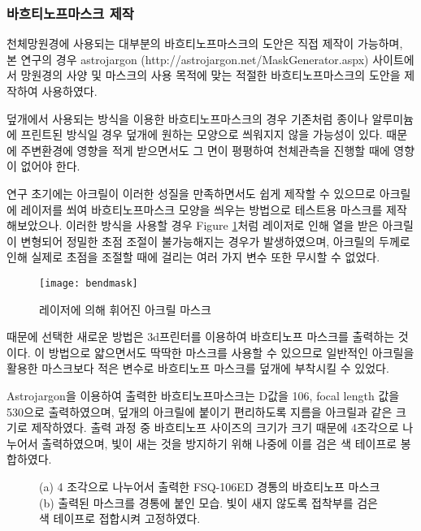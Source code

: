 \subsubsection{바흐티노프마스크 제작}
천체망원경에 사용되는 대부분의 바흐티노프마스크의 도안은 직접 제작이 가능하며, 본 연구의 경우 astrojargon (http://astrojargon.net/MaskGenerator.aspx) 사이트에서 망원경의 사양 및 마스크의 사용 목적에 맞는 적절한 바흐티노프마스크의 도안을 제작하여 사용하였다.

덮개에서 사용되는 방식을 이용한 바흐티노프마스크의 경우 기존처럼 종이나 알루미늄에 프린트된 방식일 경우 덮개에 원하는 모양으로 씌워지지 않을 가능성이 있다. 때문에 주변환경에 영향을 적게 받으면서도 그 면이 평평하여 천체관측을 진행할 때에 영향이 없어야 한다. 

연구 초기에는 아크릴이 이러한 성질을 만족하면서도 쉽게 제작할 수 있으므로 아크릴에 레이저를 쐬여 바흐티노프마스크 모양을 씌우는 방법으로 테스트용 마스크를 제작해보았으나. 이러한 방식을 사용할 경우 \textrm{Figure} \ref{bendmask}처럼 레이저로 인해 열을 받은 아크릴이 변형되어 정밀한 초점 조절이 불가능해지는 경우가 발생하였으며, 아크릴의 두께로 인해 실제로 초점을 조절할 때에 걸리는 여러 가지 변수 또한 무시할 수 없었다.

\bigskip
\begin{figure}[h]
	\begin{center}
		\texttt{[image: bendmask]}
	\end{center}
	\caption{레이저에 의해 휘어진 아크릴 마스크}
	\label{bendmask}
\end{figure}

때문에 선택한 새로운 방법은 3d프린터를 이용하여 바흐티노프 마스크를 출력하는 것이다. 이 방법으로 얇으면서도 딱딱한 마스크를 사용할 수 있으므로 일반적인 아크릴을 활용한 마스크보다 적은 변수로 바흐티노프 마스크를 덮개에 부착시킬 수 있었다.

Astrojargon을 이용하여 출력한 바흐티노프마스크는 D값을 106, focal length 값을 530으로 출력하였으며, 덮개의 아크릴에 붙이기 편리하도록 지름을 아크릴과 같은 크기로 제작하였다. 출력 과정 중 바흐티노프 사이즈의 크기가 크기 때문에 4조각으로 나누어서 출력하였으며, 빛이 새는 것을 방지하기 위해 나중에 이를 검은 색 테이프로 봉합하였다. 

\begin{figure}[ht]
	\begin{center}
	\end{center}
	\caption{(a) 4 조각으로 나누어서 출력한 FSQ-106ED 경통의 바흐티노프 마스크 (b) 출력된 마스크를 경통에 붙인 모습. 빛이 새지 않도록 접착부를 검은색 테이프로 접합시켜 고정하였다.}
	\label{mask}
\end{figure}

